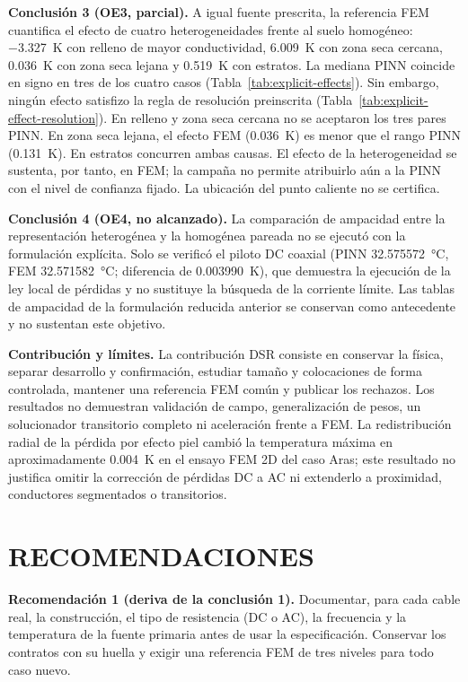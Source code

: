 \textbf{Conclusión 3 (OE3, parcial).} A igual fuente prescrita, la referencia FEM cuantifica el efecto de cuatro heterogeneidades frente al suelo homogéneo: \SI{-3,327}{\kelvin} con relleno de mayor conductividad, \SI{+6,009}{\kelvin} con zona seca cercana, \SI{+0,036}{\kelvin} con zona seca lejana y \SI{+0,519}{\kelvin} con estratos. La mediana PINN coincide en signo en tres de los cuatro casos (Tabla~\ref{tab:explicit-effects}). Sin embargo, ningún efecto satisfizo la regla de resolución preinscrita (Tabla~\ref{tab:explicit-effect-resolution}). En relleno y zona seca cercana no se aceptaron los tres pares PINN. En zona seca lejana, el efecto FEM (\SI{0,036}{\kelvin}) es menor que el rango PINN (\SI{0,131}{\kelvin}). En estratos concurren ambas causas. El efecto de la heterogeneidad se sustenta, por tanto, en FEM; la campaña no permite atribuirlo aún a la PINN con el nivel de confianza fijado. La ubicación del punto caliente no se certifica.

\textbf{Conclusión 4 (OE4, no alcanzado).} La comparación de ampacidad entre la representación heterogénea y la homogénea pareada no se ejecutó con la formulación explícita. Solo se verificó el piloto DC coaxial (PINN \SI{32,575572}{\celsius}, FEM \SI{32,571582}{\celsius}; diferencia de \SI{0,003990}{\kelvin}), que demuestra la ejecución de la ley local de pérdidas y no sustituye la búsqueda de la corriente límite. Las tablas de ampacidad de la formulación reducida anterior se conservan como antecedente y no sustentan este objetivo.

\textbf{Contribución y límites.} La contribución DSR consiste en conservar la física, separar desarrollo y confirmación, estudiar tamaño y colocaciones de forma controlada, mantener una referencia FEM común y publicar los rechazos. Los resultados no demuestran validación de campo, generalización de pesos, un solucionador transitorio completo ni aceleración frente a FEM. La redistribución radial de la pérdida por efecto piel cambió la temperatura máxima en aproximadamente \SI{0,004}{\kelvin} en el ensayo FEM 2D del caso Aras; este resultado no justifica omitir la corrección de pérdidas DC a AC ni extenderlo a proximidad, conductores segmentados o transitorios.

\section{RECOMENDACIONES}

\textbf{Recomendación 1 (deriva de la conclusión 1).} Documentar, para cada cable real, la construcción, el tipo de resistencia (DC o AC), la frecuencia y la temperatura de la fuente primaria antes de usar la especificación. Conservar los contratos con su huella y exigir una referencia FEM de tres niveles para todo caso nuevo.

